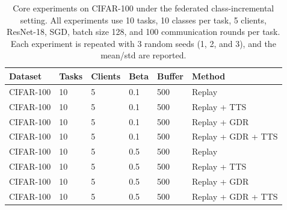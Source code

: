 \begin{table}[t]
\centering
\caption{Core experiments on CIFAR-100 under the federated class-incremental setting. All experiments use 10 tasks, 10 classes per task, 5 clients, ResNet-18, SGD, batch size 128, and 100 communication rounds per task. Each experiment is repeated with 3 random seeds (1, 2, and 3), and the mean/std are reported.}
\label{tab:core_experiments}
\begin{tabular}{llllll}
\hline
Dataset & Tasks & Clients & Beta & Buffer & Method \\
\hline
CIFAR-100 & 10 & 5 & 0.1 & 500 & Replay \\
CIFAR-100 & 10 & 5 & 0.1 & 500 & Replay + TTS \\
CIFAR-100 & 10 & 5 & 0.1 & 500 & Replay + GDR \\
CIFAR-100 & 10 & 5 & 0.1 & 500 & Replay + GDR + TTS \\
CIFAR-100 & 10 & 5 & 0.5 & 500 & Replay \\
CIFAR-100 & 10 & 5 & 0.5 & 500 & Replay + TTS \\
CIFAR-100 & 10 & 5 & 0.5 & 500 & Replay + GDR \\
CIFAR-100 & 10 & 5 & 0.5 & 500 & Replay + GDR + TTS \\
\hline
\end{tabular}
\end{table}
